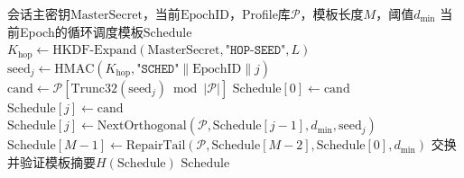 ﻿\documentclass[12pt,a4paper]{article}
\begin{document}
\begin{algorithm}[H]
\caption{机密性配置档案初始化与正交调度模板生成}
\begin{algorithmic}[1]
\Require 会话主密钥$\text{MasterSecret}$，当前$\text{EpochID}$，Profile库$\mathcal{P}$，模板长度$M$，阈值$d_{\min}$
\Ensure 当前Epoch的循环调度模板$\text{Schedule}$
\State $K_{\text{hop}} \gets \text{HKDF-Expand}(\text{MasterSecret}, \texttt{"HOP-SEED"}, L)$
    \State $\text{seed}_j \gets \text{HMAC}(K_{\text{hop}}, \texttt{"SCHED"} \| \text{EpochID} \| j)$
    \State $\text{cand} \gets \mathcal{P}[\text{Trunc32}(\text{seed}_j) \bmod |\mathcal{P}|]$
        \State $\text{Schedule}[0] \gets \text{cand}$
        \State $\text{Schedule}[j] \gets \text{cand}$
    \Else
        \State $\text{Schedule}[j] \gets \text{NextOrthogonal}(\mathcal{P}, \text{Schedule}[j-1], d_{\min}, \text{seed}_j)$
    \EndIf
\EndFor
{}
    \State $\text{Schedule}[M-1] \gets \text{RepairTail}(\mathcal{P}, \text{Schedule}[M-2], \text{Schedule}[0], d_{\min})$
\EndIf
\State 交换并验证模板摘要$H(\text{Schedule})$
\State \Return $\text{Schedule}$
\end{algorithmic}
\end{algorithm}
\end{document}
